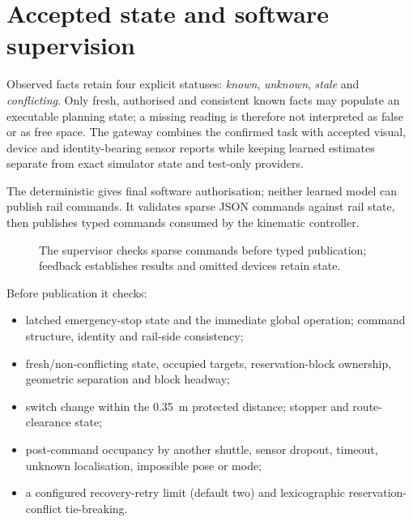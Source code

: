 \section{Accepted state and software supervision}

Observed facts retain four explicit statuses: \emph{known}, \emph{unknown},
\emph{stale} and \emph{conflicting}. Only fresh, authorised and consistent known
facts may populate an executable planning state; a missing reading is therefore
not interpreted as false or as free space. The gateway combines the confirmed
task with accepted visual, device and identity-bearing sensor reports while
keeping learned estimates separate from exact simulator state and test-only
providers.

The deterministic  gives final
software authorisation; neither learned model can publish rail commands. It
validates sparse JSON commands
against rail state, then publishes typed commands consumed by the kinematic
controller.

\begin{figure}[htbp]
  \centering
  \resizebox{0.98\textwidth}{!}{}
  \caption[Supervised sparse commands and controller feedback.]
  {The supervisor checks sparse commands before typed publication; feedback
  establishes results and omitted devices retain state.}
  \label{fig:contract-semantics}
\end{figure}
\FloatBarrier

Before publication it checks:

\begin{itemize}
  \item latched emergency-stop state and the immediate global 
  operation; command structure, identity and rail-side consistency;
  \item fresh/non-conflicting state, occupied targets, reservation-block
  ownership, geometric separation and block headway;
  \item switch change within the \SI{0.35}{m} protected distance;
  stopper and route-clearance state;
  \item post-command occupancy by another shuttle, sensor dropout, timeout,
  unknown localisation, impossible pose or  mode;
  \item a configured recovery-retry limit (default two) and lexicographic
  reservation-conflict tie-breaking.
\end{itemize}

